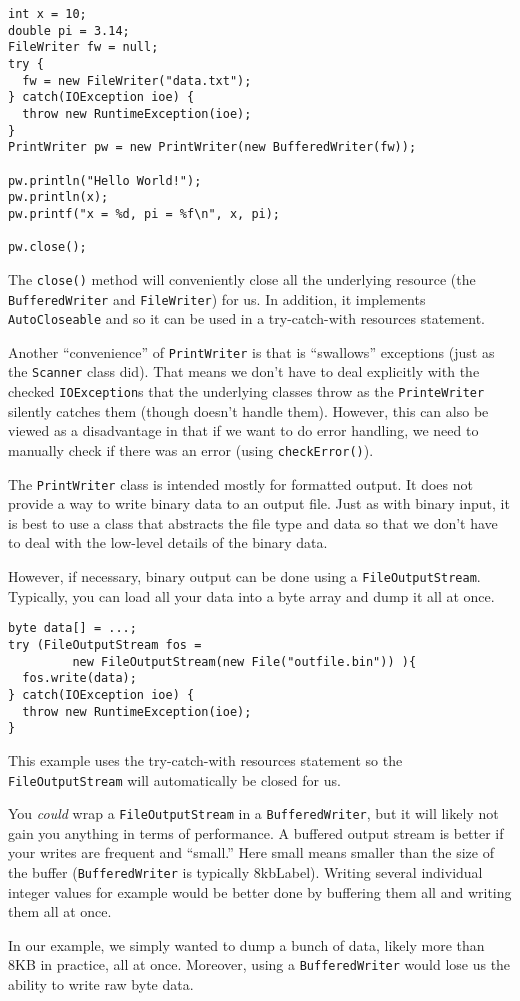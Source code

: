 \begin{verbatim}
int x = 10;
double pi = 3.14;
FileWriter fw = null;
try {
  fw = new FileWriter("data.txt");
} catch(IOException ioe) {
  throw new RuntimeException(ioe);
}
PrintWriter pw = new PrintWriter(new BufferedWriter(fw));

pw.println("Hello World!");
pw.println(x);
pw.printf("x = %d, pi = %f\n", x, pi);

pw.close();
\end{verbatim}

The \texttt{close()} method will conveniently
close all the underlying resource (the \texttt{BufferedWriter}
and \texttt{FileWriter}) for us.  In addition, 
it implements \texttt{AutoCloseable} and so it can
be used in a try-catch-with resources statement.

Another ``convenience'' of \texttt{PrintWriter} is
that is ``swallows'' exceptions (just as the \texttt{Scanner}
class did).  That means we don't have to deal explicitly with
the checked \texttt{IOException}s that the
underlying classes throw as the \texttt{PrinteWriter}
silently catches them (though doesn't handle them).  However, 
this can also be viewed as a disadvantage in that if we want
to do error handling, we need to manually check if there was 
an error (using \texttt{checkError()}).

The \texttt{PrintWriter} class is intended mostly
for formatted output.  It does not provide a way to write
binary data to an output file.  Just as with binary input, 
it is best to use a class that abstracts the file type and
data so that we don't have to deal with the low-level details
of the binary data.

However, if necessary, binary output can be done using a
\texttt{FileOutputStream}.  Typically, you can
load all your data into a byte array and dump it all at
once.

\begin{verbatim}
byte data[] = ...;
try (FileOutputStream fos = 
         new FileOutputStream(new File("outfile.bin")) ){
  fos.write(data);
} catch(IOException ioe) {
  throw new RuntimeException(ioe);
}
\end{verbatim}

This example uses the try-catch-with resources statement
so the \texttt{FileOutputStream} will automatically
be closed for us.

You \emph{could} wrap a \texttt{FileOutputStream} in a \texttt{BufferedWriter}, but it
will likely not gain you anything in terms of performance.  A
buffered output stream is better if your writes are 
frequent and ``small.'' Here small means smaller than
the size of the buffer (\texttt{BufferedWriter}
is typically 8\gls{kbLabel}).  Writing several individual
integer values for example would be better done by buffering
them all and writing them all at once.  

In our example, we simply wanted to dump a bunch of data, 
likely more than 8KB in practice, all at once.  Moreover, 
using a \texttt{BufferedWriter} would lose us the
ability to write raw byte data.


